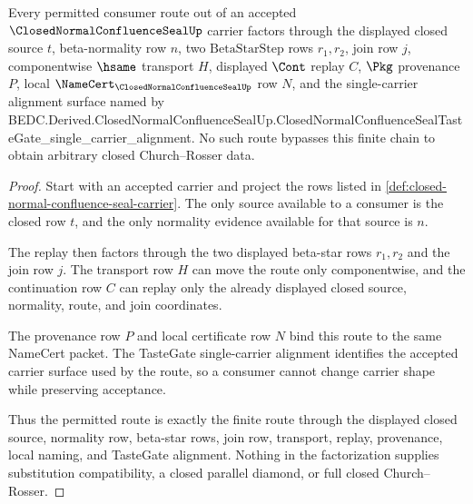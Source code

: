 \begin{theorem}
\label{thm:closed-normal-confluence-seal-scoped-route}
Every permitted consumer route out of an accepted
$\ClosedNormalConfluenceSealUp$ carrier factors through the displayed closed
source $t$, beta-normality row $n$, two $\mathrm{BetaStarStep}$ rows $r_1,r_2$,
join row $j$, componentwise $\hsame$ transport $H$, displayed $\Cont$ replay
$C$, $\Pkg$ provenance $P$, local $\NameCert_{\ClosedNormalConfluenceSealUp}$
row $N$, and the single-carrier alignment surface named by
BEDC.Derived.ClosedNormalConfluenceSealUp.ClosedNormalConfluenceSealTasteGate\_single\_carrier\_alignment.
No such route bypasses this finite chain to obtain arbitrary closed
Church--Rosser data.
\end{theorem}
\begin{proof}
Start with an accepted carrier and project the rows listed in
\autoref{def:closed-normal-confluence-seal-carrier}. The only source available
to a consumer is the closed row $t$, and the only normality evidence available
for that source is $n$.

The replay then factors through the two displayed beta-star rows $r_1,r_2$ and
the join row $j$. The transport row $H$ can move the route only componentwise,
and the continuation row $C$ can replay only the already displayed closed
source, normality, route, and join coordinates.

The provenance row $P$ and local certificate row $N$ bind this route to the
same NameCert packet. The TasteGate single-carrier alignment identifies the
accepted carrier surface used by the route, so a consumer cannot change carrier
shape while preserving acceptance.

Thus the permitted route is exactly the finite route through the displayed
closed source, normality row, beta-star rows, join row, transport, replay,
provenance, local naming, and TasteGate alignment. Nothing in the factorization
supplies substitution compatibility, a closed parallel diamond, or full closed
Church--Rosser.
\end{proof}

